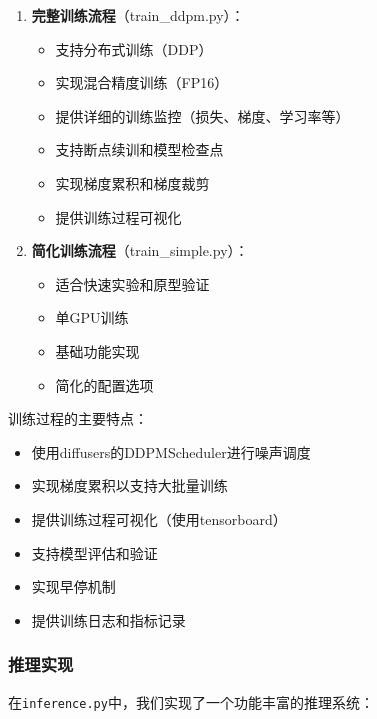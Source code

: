 \documentclass{ctexart}
\begin{document}
\begin{enumerate}
    \item \textbf{完整训练流程}（train\_ddpm.py）：
    \begin{itemize}
        \item 支持分布式训练（DDP）
        \item 实现混合精度训练（FP16）
        \item 提供详细的训练监控（损失、梯度、学习率等）
        \item 支持断点续训和模型检查点
        \item 实现梯度累积和梯度裁剪
        \item 提供训练过程可视化
    \end{itemize}
    
    \item \textbf{简化训练流程}（train\_simple.py）：
    \begin{itemize}
        \item 适合快速实验和原型验证
        \item 单GPU训练
        \item 基础功能实现
        \item 简化的配置选项
    \end{itemize}
\end{enumerate}

\noindent
训练过程的主要特点：
\begin{itemize}
    \item 使用diffusers的DDPMScheduler进行噪声调度
    \item 实现梯度累积以支持大批量训练
    \item 提供训练过程可视化（使用tensorboard）
    \item 支持模型评估和验证
    \item 实现早停机制
    \item 提供训练日志和指标记录
\end{itemize}

\subsubsection{推理实现}
\noindent
在\texttt{inference.py}中，我们实现了一个功能丰富的推理系统：
\end{document}
